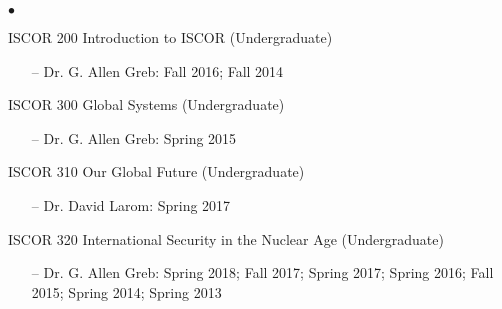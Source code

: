\documentclass[letterpaper,12pt]{article}
\newenvironment{list2}{
  \begin{list}{$\bullet$}{%
      \setlength{\itemsep}{0in}
      \setlength{\parsep}{0in} 
      \setlength{\parskip}{0in}
      \setlength{\topsep}{0in} 
      \setlength{\partopsep}{0in}
      \setlength{\leftmargin}{1in}
      \setlength{\labelsep}{1em}
      \setlength{\labelwidth}{1em}
      \setlength{\itemindent}{-2em}
      \setlength{\listparindent}{2em}}}{\end{list}}
\begin{document}
\begin{list2}
    \item ISCOR 200 Introduction to ISCOR (Undergraduate)
        \begin{enumerate}[leftmargin=!,labelindent=0pt,itemindent=-15pt]
            \item[--] Dr. G. Allen Greb: Fall 2016; Fall 2014
        \end{enumerate}
    \item ISCOR 300 Global Systems (Undergraduate)
        \begin{enumerate}[leftmargin=!,labelindent=0pt,itemindent=-15pt]
            \item[--] Dr. G. Allen Greb: Spring 2015
        \end{enumerate}
    \item ISCOR 310 Our Global Future (Undergraduate)
        \begin{enumerate}[leftmargin=!,labelindent=0pt,itemindent=-15pt]
            \item[--] Dr. David Larom: Spring 2017
        \end{enumerate}
    \item ISCOR 320 International Security in the Nuclear Age (Undergraduate)
        \begin{enumerate}[leftmargin=!,labelindent=0pt,itemindent=-15pt]
            \item[--]  Dr. G. Allen Greb: Spring 2018; Fall 2017; Spring 2017; Spring 2016; Fall 2015; Spring 2014; Spring 2013
        \end{enumerate}
\end{list2}

\end{document}
